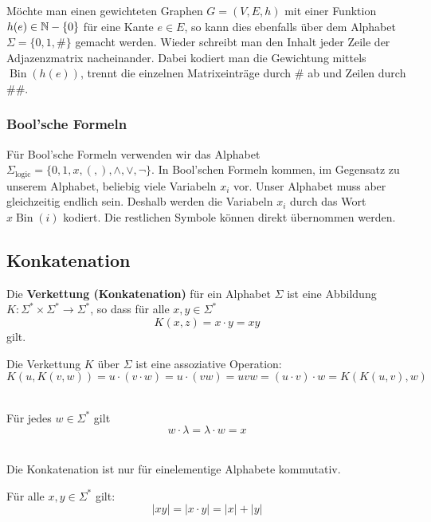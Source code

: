 Möchte man einen gewichteten Graphen $G = (V, E, h)$ mit einer Funktion $h(e) \in \mathbb{N} - \{0\}$ für eine Kante $e \in E$, so kann dies ebenfalls über dem Alphabet $\Sigma = \{0, 1, \#\}$ gemacht werden. Wieder schreibt man den Inhalt jeder Zeile der Adjazenzmatrix nacheinander. Dabei kodiert man die Gewichtung mittels $\operatorname{Bin}(h(e))$, trennt die einzelnen Matrixeinträge durch $\#$ ab und Zeilen durch $\#\#$.

\subsubsection{Bool'sche Formeln}
Für Bool'sche Formeln verwenden wir das Alphabet $\Sigma_\text{logic} = \{0, 1, x, (, ), \land, \lor, \lnot\}$. In Bool'schen Formeln kommen, im Gegensatz zu unserem Alphabet, beliebig viele Variabeln $x_i$ vor. Unser Alphabet muss aber gleichzeitig endlich sein. Deshalb werden die Variabeln $x_i$ durch das Wort $x\operatorname{Bin}(i)$ kodiert. Die restlichen Symbole können direkt übernommen werden.

\subsection{Konkatenation}
\begin{definition}
Die \textbf{Verkettung (Konkatenation)} für ein Alphabet $\Sigma$ ist eine Abbildung $K: \Sigma^* \times \Sigma^* \to \Sigma^*$, so dass für alle $x, y \in \Sigma^*$
\[
K(x, z) = x \cdot y = xy
\]
gilt.\\
\end{definition}

\begin{remark}
Die Verkettung $K$ über $\Sigma$ ist eine assoziative Operation:
\[
K(u, K(v, w)) = u \cdot (v \cdot w) = u \cdot (vw) = uvw = (u \cdot v) \cdot w = K(K(u, v), w)
\]\\
\end{remark}

\begin{remark}
Für jedes $w \in \Sigma^*$ gilt
\[
w \cdot \lambda = \lambda \cdot w = x
\]\\
\end{remark}

\begin{remark}
Die Konkatenation ist nur für einelementige Alphabete kommutativ.\\
\end{remark}

\begin{remark}
Für alle $x, y \in \Sigma^*$ gilt:
\[
|xy| = |x \cdot y| = |x| + |y|
\]
\end{remark}

